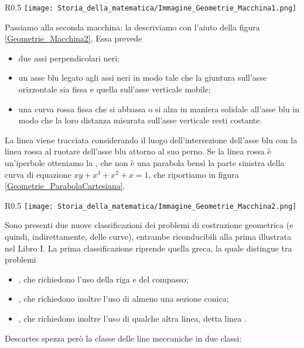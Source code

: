 \begin{wrapfigure}{R}{0.5\textwidth}
	\texttt{[image: Storia\_della\_matematica/Immagine\_Geometrie\_Macchina1.png]}
	\caption{Una macchina descritta da Descartes.}
	\label{Geometrie_Macchina1}
\end{wrapfigure}
\par Passiamo alla seconda macchina: la descriviamo con l'aiuto della figura \ref{Geometrie_Macchina2}. Essa prevede
\begin{itemize}
	\item due assi perpendicolari neri;
	\item un asse blu legato agli assi neri in modo tale che la giuntura sull'asse orizzontale sia fissa e quella sull'asse verticale mobile;
	\item una curva rossa fissa che si abbassa o si alza in maniera solidale all'asse blu in modo che la loro distanza misurata sull'asse verticale resti costante.
\end{itemize}
\par La linea viene tracciata considerando il luogo dell'intersezione dell'asse blu con la linea rossa al ruotare dell'asse blu attorno al suo perno. Se la linea rossa \`e un'iperbole otteniamo la , che non \`e una parabola bens\`i la parte sinistra della curva di equazione $xy + x^3 + x^2 + x = 1$, che riportiamo in figura \ref{Geometrie_ParabolaCartesiana}.
\begin{wrapfigure}{R}{0.5\textwidth}
	\texttt{[image: Storia\_della\_matematica/Immagine\_Geometrie\_Macchina2.png]}
	\caption{Un'altra macchina descritta da Descartes.}
	\label{Geometrie_Macchina2}
\end{wrapfigure}
\par Sono presenti due nuove classificazioni dei problemi di costruzione geometrica (e quindi, indirettamente, delle curve), entrambe riconducibili alla prima illustrata nel Libro I. La prima classificazione riprende quella greca, la quale distingue tra problemi
\begin{itemize}
	\item {}, che richiedono l'uso della riga e del compasso;
	\item {}, che richiedono inoltre l'uso di almeno una sezione conica;
	\item {}, che richiedono inoltre l'uso di qualche altra linea, detta linea .
\end{itemize}
\par Descartes spezza per\`o la classe delle line meccaniche in due classi:
